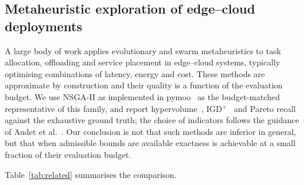 \subsection{Metaheuristic exploration of edge--cloud deployments}
A large body of work applies evolutionary and swarm metaheuristics to task allocation,
offloading and service placement in edge--cloud systems, typically optimising
combinations of latency, energy and cost. These methods are approximate by construction
and their quality is a function of the evaluation budget. We use NSGA-II
\cite{deb2002nsga2} as implemented in pymoo~\cite{blank2020pymoo} as the budget-matched
representative of this family, and report hypervolume~\cite{zitzler1999hv},
IGD$^{+}$~\cite{ishibuchi2015igdplus} and Pareto recall against the exhaustive ground
truth; the choice of indicators follows the guidance of
Audet et al.~\cite{audet2021indicators}. Our conclusion is not that such methods are inferior in general, but that when
admissible bounds are available exactness is achievable at a small fraction of their
evaluation budget.

Table~\ref{tab:related} summarises the comparison.

